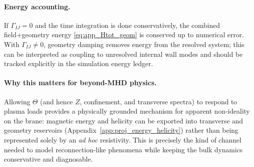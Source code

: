 \documentclass[11pt]{article}
\begin{document}
\paragraph{Energy accounting.}
If \(\Gamma_{IJ}=0\) and the time integration is done conservatively, the combined field+geometry energy
\eqref{eq:app_Htot_geom} is conserved up to numerical error. With \(\Gamma_{IJ}\neq 0\), geometry damping removes
energy from the resolved system; this can be interpreted as coupling to unresolved internal wall modes and should
be tracked explicitly in the simulation energy ledger.

\paragraph{Why this matters for beyond-MHD physics.}
Allowing \(\Theta\) (and hence \(Z\), confinement, and transverse spectra) to respond to plasma loads provides a
physically grounded mechanism for apparent non-ideality on the brane: magnetic energy and helicity can be exported
into transverse and geometry reservoirs (Appendix~\ref{app:proj_energy_helicity}) rather than being represented
solely by an \emph{ad hoc} resistivity. This is precisely the kind of channel needed to model reconnection-like
phenomena while keeping the bulk dynamics conservative and diagnosable.
\end{document}
